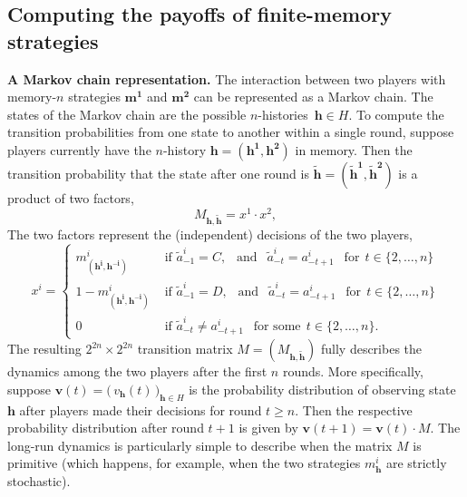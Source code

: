 \documentclass[11pt]{article}
\theoremstyle{plainCl1}
\theoremstyle{plainCl2}
\begin{document}
\subsection{Computing the payoffs of finite-memory strategies} \label{Sec:PayoffComputation}


\noindent
{\bf A Markov chain representation.}
The interaction between two players with memory-\(n\) strategies \(\mathbf{m^{1}}\) and \(\mathbf{m^{2}}\) can be represented as a Markov chain. 
The states of the Markov chain are the possible $n$-histories~$\mathbf{h}\!\in\!H$. 
To compute the transition probabilities from one state to another within a single round, suppose  players currently have the $n$-history \(\mathbf{h}\!=\!(\mathbf{h^1}, \mathbf{h^2})\) in memory.
Then the transition probability that the state after one round is $\mathbf{\tilde h}\!=\!(\mathbf{\tilde h^1},\mathbf{\tilde h^2})$ is a product of two factors,
\begin{equation}\label{Eq:TransitionMatrix}
M_{\mathbf{h}, \mathbf{\tilde h}} = x^1 \cdot x^2,
\end{equation}
The two factors represent the (independent) decisions of the two players,
\begin{equation}
x^i = \left\{
\begin{array}{ll}
  m^{i}_{(\mathbf{h^i},\mathbf{h^{-i}})} & \text{ if } \tilde{a}^i_{-1} \!=\! C, ~~\text{ and }~~ \tilde a^i_{-t} \!=\! a^i_{-t + 1} ~~\text{ for}~~t\!\in\!\{2,\ldots,n\}\\[0.1cm]
  1 \!-\! m^{i}_{(\mathbf{h^i},\mathbf{h^{-i}})} & \text{ if } \tilde{a}^i_{-1} \!=\! D, ~~\text{ and }~~ \tilde a^i_{-t} \!=\! a^i_{-t + 1} ~~\text{ for}~~t\!\in\!\{2,\ldots,n\}\\[0.1cm]
  0 & \text{ if } \tilde a^i_{-t} \neq  a^i_{-t + 1}~~\text{ for some}~~t\!\in\!\{2,\ldots,n\}.
\end{array}
\right.
\end{equation}
The resulting  \(2^{2n} \times 2^{2n}\) transition matrix $M\!=\!(M_{\mathbf{h},\mathbf{\tilde h}})$ fully describes the dynamics among the two players after the first $n$ rounds. 
More specifically, suppose $\mathbf{v}(t) \!=\! \big(\,v_\mathbf{h}(t)\,\big)_{\mathbf{h}\in H}$ is the probability distribution of observing state~$\mathbf{h}$ after players made their decisions for round $t\!\ge\!n$.
Then the respective probability distribution after round $t\!+\!1$ is given by $\mathbf{v}(t\!+\!1) \!=\! \mathbf{v}(t)\cdot M$. 
The long-run dynamics is particularly simple to describe when the matrix $M$ is primitive (which happens, for example, when the two strategies $m^i_\mathbf{h}$ are strictly stochastic). 
\end{document}

